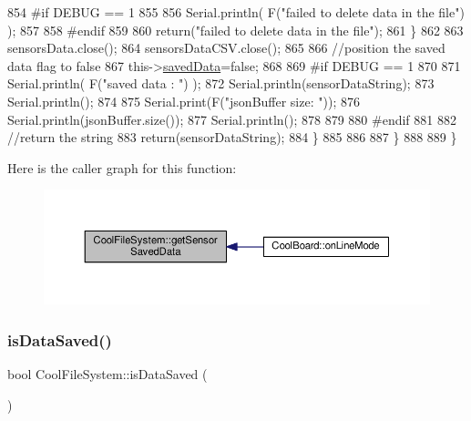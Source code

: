 \begin{DoxyCode}
854 \textcolor{preprocessor}{            #if DEBUG == 1}
855         
856                 Serial.println( F(\textcolor{stringliteral}{"failed to delete data in the file"}) );
857         
858 \textcolor{preprocessor}{            #endif}
859 
860                 \textcolor{keywordflow}{return}(\textcolor{stringliteral}{"failed to delete data in the file"});
861             \}
862 
863             sensorsData.close();
864             sensorsDataCSV.close();
865 
866             \textcolor{comment}{//position the saved data flag to false}
867             this->\hyperlink{classCoolFileSystem_ad398e0c5c41a0c88acdf5d672aa71351}{savedData}=\textcolor{keyword}{false}; 
868             
869 \textcolor{preprocessor}{        #if DEBUG == 1 }
870 
871             Serial.println( F(\textcolor{stringliteral}{"saved data : "}) );
872             Serial.println(sensorDataString);
873             Serial.println();
874 
875             Serial.print(F(\textcolor{stringliteral}{"jsonBuffer size: "}));
876             Serial.println(jsonBuffer.size());
877             Serial.println();
878 
879         
880 \textcolor{preprocessor}{        #endif}
881 
882             \textcolor{comment}{//return the string}
883             \textcolor{keywordflow}{return}(sensorDataString);       
884         \}
885         
886         
887     \}
888 
889 \}
\end{DoxyCode}
Here is the caller graph for this function\+:
\nopagebreak
\begin{figure}[H]
\begin{center}
\leavevmode
\includegraphics[width=350pt]{classCoolFileSystem_a5c58bca3735c0ed3efb268d70ef998ef_icgraph}
\end{center}
\end{figure}
\mbox{\label{classCoolFileSystem_a5a7eaeea7a9fbf8aaef651d862fa3b5b}} 
\subsubsection{\texorpdfstring{is\+Data\+Saved()}{isDataSaved()}}
{\footnotesize\ttfamily bool Cool\+File\+System\+::is\+Data\+Saved (\begin{DoxyParamCaption}{ }\end{DoxyParamCaption})}

